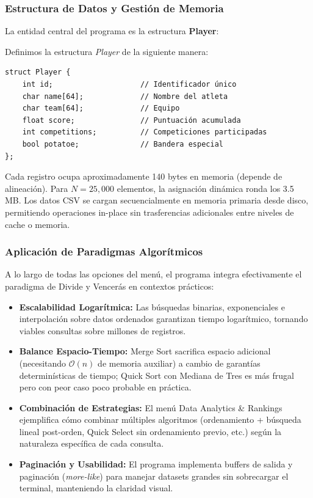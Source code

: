 \subsubsection{Estructura de Datos y Gestión de Memoria}\label{sec:estructura_datos}

La entidad central del programa es la estructura \textbf{Player}:

Definimos la estructura \textit{Player} de la siguiente manera:
\begin{verbatim}
struct Player {
    int id;                    // Identificador único
    char name[64];             // Nombre del atleta
    char team[64];             // Equipo
    float score;               // Puntuación acumulada
    int competitions;          // Competiciones participadas
    bool potatoe;              // Bandera especial
};
\end{verbatim}

Cada registro ocupa aproximadamente 140 bytes en memoria (depende de alineación). Para $N = 25,000$ elementos, la asignación dinámica ronda los 3.5 MB. Los datos CSV se cargan secuencialmente en memoria primaria desde disco, permitiendo operaciones in-place sin trasferencias adicionales entre niveles de cache o memoria.

\subsubsection{Aplicación de Paradigmas Algorítmicos}\label{sec:aplicacion_paradigmas}

A lo largo de todas las opciones del menú, el programa integra efectivamente el paradigma de Divide y Vencerás en contextos prácticos:

\begin{itemize}
    \item \textbf{Escalabilidad Logarítmica:} Las búsquedas binarias, exponenciales e interpolación sobre datos ordenados garantizan tiempo logarítmico, tornando viables consultas sobre millones de registros.
    \item \textbf{Balance Espacio-Tiempo:} Merge Sort sacrifica espacio adicional (necesitando $\mathcal{O}(n)$ de memoria auxiliar) a cambio de garantías determinísticas de tiempo; Quick Sort con Mediana de Tres es más frugal pero con peor caso poco probable en práctica.
    \item \textbf{Combinación de Estrategias:} El menú Data Analytics \& Rankings ejemplifica cómo combinar múltiples algoritmos (ordenamiento + búsqueda lineal post-orden, Quick Select sin ordenamiento previo, etc.) según la naturaleza específica de cada consulta.
    \item \textbf{Paginación y Usabilidad:} El programa implementa buffers de salida y paginación (\textit{more-like}) para manejar datasets grandes sin sobrecargar el terminal, manteniendo la claridad visual.
\end{itemize}

